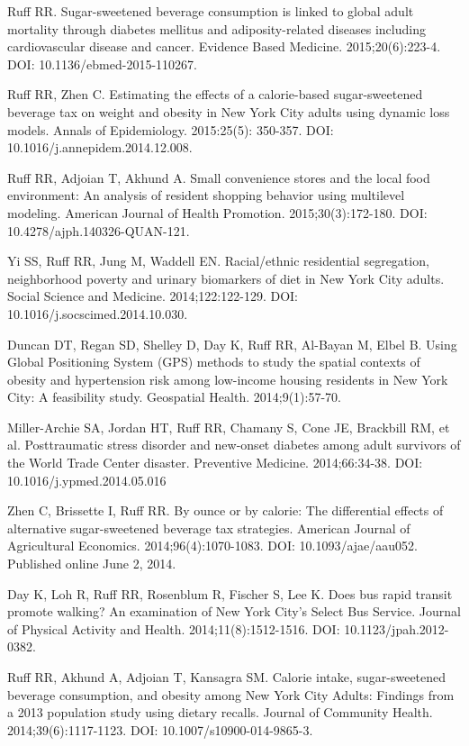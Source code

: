 \documentclass[margin,line]{res}
\begin{document}
\begin{resume}
Ruff RR. Sugar-sweetened beverage consumption is linked to global adult mortality through diabetes mellitus and adiposity-related diseases including cardiovascular disease and cancer. Evidence Based Medicine. 2015;20(6):223-4. DOI: 10.1136/ebmed-2015-110267.

Ruff RR, Zhen C. Estimating the effects of a calorie-based sugar-sweetened beverage tax on weight and obesity in New York City adults using dynamic loss models. Annals of Epidemiology. 2015:25(5):
350-357. DOI: 10.1016/j.annepidem.2014.12.008.

Ruff RR, Adjoian T, Akhund A. Small convenience stores and the local food environment: An analysis of resident shopping behavior using multilevel modeling. American Journal of Health Promotion. 2015;30(3):172-180. DOI: 10.4278/ajph.140326-QUAN-121.

Yi SS, Ruff RR, Jung M, Waddell EN. Racial/ethnic residential segregation, neighborhood poverty and urinary biomarkers of diet in New York City adults. Social Science and Medicine. 2014;122:122-129. DOI: 10.1016/j.socscimed.2014.10.030.

Duncan DT, Regan SD, Shelley D, Day K, Ruff RR, Al-Bayan M, Elbel B. Using Global Positioning System (GPS) methods to study the spatial contexts of obesity and hypertension risk among low-income housing residents in New York City: A feasibility study. Geospatial Health. 2014;9(1):57-70.

Miller-Archie SA, Jordan HT, Ruff RR, Chamany S, Cone JE, Brackbill RM, et al. Posttraumatic stress disorder and new-onset diabetes among adult survivors of the World Trade Center disaster. Preventive Medicine. 2014;66:34-38. DOI: 10.1016/j.ypmed.2014.05.016

Zhen C, Brissette I, Ruff RR. By ounce or by calorie: The differential effects of alternative sugar-sweetened beverage tax strategies. American Journal of Agricultural Economics. 2014;96(4):1070-1083. DOI: 10.1093/ajae/aau052. Published online June 2, 2014.

Day K, Loh R, Ruff RR, Rosenblum R, Fischer S, Lee K. Does bus rapid transit promote walking? An examination of New York City’s Select Bus Service. Journal of Physical Activity and Health. 2014;11(8):1512-1516. DOI: 10.1123/jpah.2012-0382.

Ruff RR, Akhund A, Adjoian T, Kansagra SM. Calorie intake, sugar-sweetened beverage consumption, and obesity among New York City Adults: Findings from a 2013 population study using dietary recalls. Journal of Community Health. 2014;39(6):1117-1123. DOI: 10.1007/s10900-014-9865-3.


\end{resume}
\end{document}
